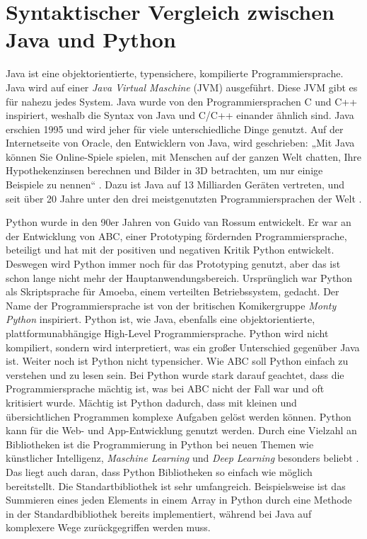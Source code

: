 \newcommand{\code}[1]{\texttt{#1}}

\chapter{Syntaktischer Vergleich zwischen Java und Python}
Java ist eine objektorientierte, typensichere, kompilierte Programmiersprache. 
Java wird auf einer \textit{Java Virtual Maschine} (JVM) ausgeführt. 
Diese JVM gibt es für nahezu jedes System. 
Java wurde von den Programmiersprachen C und C++ inspiriert, weshalb die Syntax von Java und C/C++ einander ähnlich sind. 
Java erschien 1995 und wird jeher für viele unterschiedliche Dinge genutzt. 
Auf der Internetseite von Oracle, den Entwicklern von Java, wird geschrieben: „Mit Java können Sie Online-Spiele spielen, mit Menschen auf der ganzen Welt chatten, Ihre Hypothekenzinsen berechnen und Bilder in 3D betrachten, um nur einige Beispiele zu nennen“ \cite{Oracle:Java}. 
Dazu ist Java auf 13 Milliarden Geräten vertreten, und seit über 20 Jahre unter den drei meistgenutzten Programmiersprachen der Welt \cite{Github:PYPL}. \cite{Louis:2010}\cite{Oracle:Twitter} 
\par
Python wurde in den 90er Jahren von Guido van Rossum entwickelt. 
Er war an der Entwicklung von ABC, einer Prototyping fördernden Programmiersprache, beteiligt und hat mit der positiven und negativen Kritik Python entwickelt. 
Deswegen wird Python immer noch für das Prototyping genutzt, aber das ist schon lange nicht mehr der Hauptanwendungsbereich. 
Ursprünglich war Python als Skriptsprache für Amoeba, einem verteilten Betriebssystem, gedacht. 
Der Name der Programmiersprache ist von der britischen Komikergruppe \textit{Monty Python} inspiriert. 
Python ist, wie Java, ebenfalls eine objektorientierte, plattformunabhängige High-Level Programmiersprache. 
Python wird nicht kompiliert, sondern wird interpretiert, was ein großer Unterschied gegenüber Java ist. 
Weiter noch ist Python nicht typensicher. 
Wie ABC soll Python einfach zu verstehen und zu lesen sein. 
Bei Python wurde stark darauf geachtet, dass die Programmiersprache mächtig ist, was bei ABC nicht der Fall war und oft kritisiert wurde. 
Mächtig ist Python dadurch, dass mit kleinen und übersichtlichen Programmen komplexe Aufgaben gelöst werden können. 
Python kann für die Web- und App-Entwicklung genutzt werden. 
Durch eine Vielzahl an Bibliotheken ist die Programmierung in Python bei neuen Themen wie künstlicher Intelligenz, \textit{Maschine Learning} und \textit{Deep Learning} besonders beliebt \cite{PythonCS}. 
Das liegt auch daran, dass Python Bibliotheken so einfach wie möglich bereitstellt. 
Die Standartbibliothek ist sehr umfangreich. 
Beispielsweise ist das Summieren eines jeden Elements in einem Array in Python durch eine Methode in der Standardbibliothek bereits implementiert, während bei Java auf komplexere Wege zurückgegriffen werden muss. \cite{Python3:Buch}


